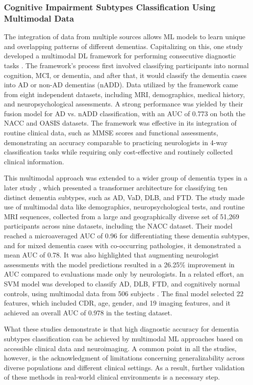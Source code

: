 \subsubsection{Cognitive Impairment Subtypes Classification Using Multimodal Data}
The integration of data from multiple sources allows ML models to learn unique and overlapping patterns of different dementias. Capitalizing on this, one study developed a multimodal DL framework for performing consecutive diagnostic tasks \cite{Qiu2022Multimodal}. The framework's process first involved classifying participants into normal cognition, MCI, or dementia, and after that, it would classify the dementia cases into AD or non-AD dementias (\acrshort{nADD}). Data utilized by the framework came from eight independent datasets, including MRI, demographics, medical history, and neuropsychological assessments. A strong performance was yielded by their fusion model for AD vs. nADD classification, with an AUC of 0.773 on both the NACC and OASIS datasets. The framework was effective in its integration of routine clinical data, such as MMSE scores and functional assessments, demonstrating an accuracy comparable to practicing neurologists in 4-way classification tasks while requiring only cost-effective and routinely collected clinical information.

This multimodal approach was extended to a wider group of dementia types in a later study \cite{Xue2024AI}, which presented a transformer architecture for classifying ten distinct dementia subtypes, such as AD, VaD, DLB, and FTD. The study made use of multimodal data like demographics, neuropsychological tests, and routine MRI sequences, collected from a large and geographically diverse set of 51,269 participants across nine datasets, including the NACC dataset. Their model reached a microaveraged AUC of 0.96 for differentiating these dementia subtypes, and for mixed dementia cases with co-occurring pathologies, it demonstrated a mean AUC of 0.78. It was also highlighted that augmenting neurologist assessments with the model predictions resulted in a 26.25\% improvement in AUC compared to evaluations made only by neurologists. In a related effort, an SVM model was developed to classify AD, DLB, FTD, and cognitively normal controls, using multimodal data from 506 subjects \cite{Silvia2023Differential}. The final model selected 22 features, which included CDR, age, gender, and 19 imaging features, and it achieved an overall AUC of 0.978 in the testing dataset.

What these studies demonstrate is that high diagnostic accuracy for dementia subtypes classification can be achieved by multimodal ML approaches based on accessible clinical data and neuroimaging. A common point in all the studies, however, is the acknowledgment of limitations concerning generalizability across diverse populations and different clinical settings. As a result, further validation of these methods in real-world clinical environments is a necessary step.

